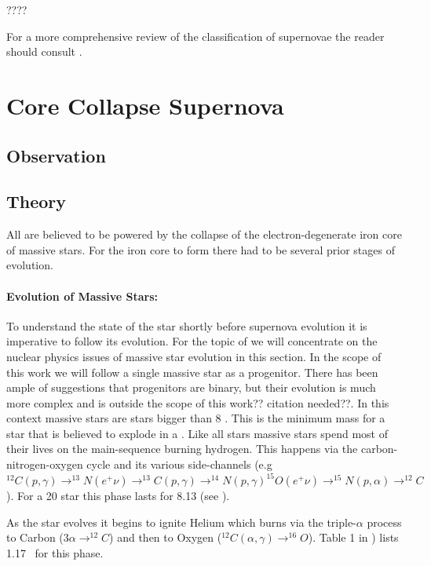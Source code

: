 ???? 

For a more comprehensive review of the classification of supernovae the reader should consult \citet{2003LNP...598...21T, 2007AIPC..937..187T}.

\section{Core Collapse Supernova}
\subsection{Observation}

\subsection{Theory}
All \snii are believed to be powered by the collapse of the electron-degenerate iron core of massive stars. For the iron core to form there had to be several prior stages of evolution.

\paragraph{Evolution of Massive Stars:}  To understand the state of the star shortly before supernova evolution it is imperative to follow its evolution. For the topic of \snii we will concentrate on the nuclear physics issues of massive star evolution in this section. In the scope of this work we will follow a single massive star as a progenitor. There has been ample of suggestions that \snii progenitors are binary, but their evolution is much more complex and is outside the scope of this work?? citation needed??.  In this context massive stars are stars bigger than 8 \msun. This is the minimum mass for a star that is believed to explode in a \snii. Like all stars massive stars spend most of their lives on the main-sequence burning hydrogen. This happens via the carbon-nitrogen-oxygen cycle and its various side-channels (e.g $^{12}C(p,\gamma)\rightarrow^{13}N(e^+\nu)\rightarrow^{13}C(p,\gamma)\rightarrow^{14}N(p,\gamma)^{15}O(e^+\nu)\rightarrow^{15}N(p,\alpha)\rightarrow^{12}C$). For a 20 \msun star this phase lasts for 8.13 \myr (see \citet{2002RvMP...74.1015W}).

As the star evolves it begins to ignite Helium which burns via the triple-$\alpha$ process to Carbon ($3\alpha\rightarrow^{12}C$) and then to Oxygen ($^{12}C(\alpha,\gamma)\rightarrow^{16}O$). Table 1 in \citet{2002RvMP...74.1015W}) lists 1.17 \myr\ for this phase. 

